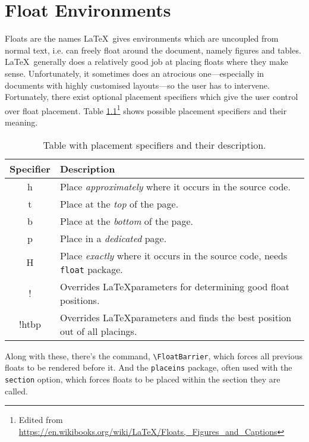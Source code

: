 \chapter{Float Environments}
%
Floats are the names \LaTeX~gives environments which are uncoupled
from normal text, i.e. can freely float around the document, namely
figures and tables.  \LaTeX~generally does a relatively good job at
placing floats where they make sense.  Unfortunately, it sometimes does
an atrocious one---especially in documents with highly customised
layouts---so the user has to intervene.  Fortunately, there exist
optional placement specifiers which give the user control over float
placement.  Table \ref{t:placspec}\footnote{Edited from
  \url{https://en.wikibooks.org/wiki/LaTeX/Floats,_Figures_and_Captions}}
shows possible placement specifiers and their meaning.
\begin{table}[!htbp]
  \centering
  \caption{Table with placement specifiers and their description.}
  \label{t:placspec}
  \begin{tabular}{cl}
    \toprule
    Specifier & Description\\
    \midrule
    h   & Place \emph{approximately} where it occurs in the source code.\\
    t   & Place at the \emph{top} of the page.\\
    b   & Place at the \emph{bottom} of the page.\\
    p   & Place in a \emph{dedicated} page.\\
    H   & Place \emph{exactly} where it occurs in the source code, needs \verb|float| package.\\
    !   & Overrides \LaTeX parameters for determining good float positions.\\
    !htbp   & Overrides \LaTeX parameters and finds the best position out of all placings.\\
    \bottomrule
  \end{tabular}
\end{table}

Along with these, there's the command, \verb|\FloatBarrier|, which
forces all previous floats to be rendered before it.  And the
\verb|placeins| package, often used with the \verb|section| option,
which forces floats to be placed within the section they are called.

